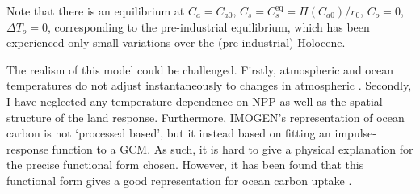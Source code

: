 Note that there is an equilibrium at $C_a = C_{a0}$, $C_s = C_s^{\mathrm{eq}} = \Pi(C_{a0})/r_0$, $C_o = 0$, $\Delta T_o = 0$, corresponding to the pre-industrial equilibrium, which has been
experienced only small variations over the (pre-industrial) Holocene.

The realism of this model could be challenged. Firstly, atmospheric and ocean temperatures do not adjust instantaneously to
changes in atmospheric . Secondly, I have neglected any temperature dependence on NPP as well as the spatial structure of the land response.
Furthermore, IMOGEN's representation of ocean carbon is not `processed based', but it instead based on fitting an impulse-response function to a GCM.
As such, it is hard to give a physical explanation for the precise functional form chosen. However, it has been found that this functional form gives a good
representation for ocean carbon uptake \parencite{Joos1996}.

